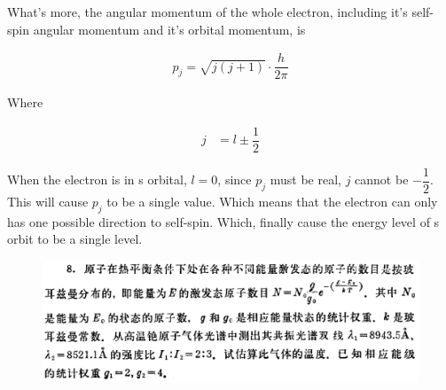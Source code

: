 \documentclass{article}
\begin{document}
What's more, the angular momentum of the whole electron, including it's self-spin angular momentum and it's orbital momentum, is

\begin{equation*}
  \begin{aligned}
    p_j = \sqrt{j \left( j + 1 \right)} \cdot \dfrac{h}{2 \pi} 
  \end{aligned}
\end{equation*}

Where

\begin{equation*}
  \begin{aligned}
    j &= l \pm \dfrac{1}{2}  
  \end{aligned}
\end{equation*}

When the electron is in s orbital, $l = 0$, since $p_j$ must be real, $j$ cannot be $-\dfrac{1}{2} $. This will cause $p_j$ to be a single value. Which means that the electron can only has one possible direction to self-spin. Which, finally cause the energy level of s orbit to be a single level.

\begin{figure}[H]
  \centering
  \includegraphics[width=\linewidth]{figures/8}
  \label{fig:}
\end{figure}
\end{document}
